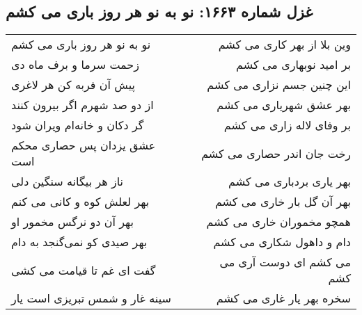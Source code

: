 \begin{center}
\section*{غزل شماره ۱۶۶۳: نو به نو هر روز باری می کشم}
\label{sec:1663}
\begin{longtable}{l p{0.5cm} r}
نو به نو هر روز باری می کشم
&&
وین بلا از بهر کاری می کشم
\\
زحمت سرما و برف ماه دی
&&
بر امید نوبهاری می کشم
\\
پیش آن فربه کن هر لاغری
&&
این چنین جسم نزاری می کشم
\\
از دو صد شهرم اگر بیرون کنند
&&
بهر عشق شهریاری می کشم
\\
گر دکان و خانه‌ام ویران شود
&&
بر وفای لاله زاری می کشم
\\
عشق یزدان پس حصاری محکم است
&&
رخت جان اندر حصاری می کشم
\\
ناز هر بیگانه سنگین دلی
&&
بهر یاری بردباری می کشم
\\
بهر لعلش کوه و کانی می کنم
&&
بهر آن گل بار خاری می کشم
\\
بهر آن دو نرگس مخمور او
&&
همچو مخموران خاری می کشم
\\
بهر صیدی کو نمی‌گنجد به دام
&&
دام و داهول شکاری می کشم
\\
گفت ای غم تا قیامت می کشی
&&
می کشم ای دوست آری می کشم
\\
سینه غار و شمس تبریزی است یار
&&
سخره بهر یار غاری می کشم
\\
\end{longtable}
\end{center}
